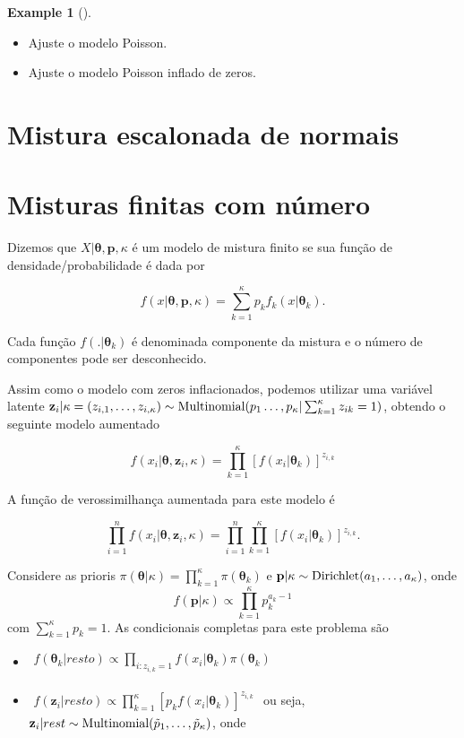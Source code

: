 \documentclass[
  letterpaper,
  DIV=11,
  numbers=noendperiod]{scrreprt}
\theoremstyle{definition}
\theoremstyle{plain}
\theoremstyle{definition}
\newtheorem{example}{Example}[chapter]
\theoremstyle{remark}
\begin{document}
\begin{example}[]
\begin{itemize}
\item
  Ajuste o modelo Poisson.
\item
  Ajuste o modelo Poisson inflado de zeros.
\end{itemize}

\section{Mistura escalonada de
normais}\label{mistura-escalonada-de-normais}

\section{Misturas finitas com
número}\label{misturas-finitas-com-nuxfamero}

Dizemos que \(X|\boldsymbol{\theta},\boldsymbol{p},\kappa\) é um modelo
de mistura finito se sua função de densidade/probabilidade é dada por

\[f(x| \boldsymbol{\theta},\boldsymbol{p} ,\kappa )=\sum_{k=1}^\kappa p_k f_k(x|\boldsymbol{\theta}_k).\]

Cada função \(f(.|\boldsymbol{\theta}_k)\) é denominada componente da
mistura e o número de componentes pode ser desconhecido.

Assim como o modelo com zeros inflacionados, podemos utilizar uma
variável latente
\(\textbf{z}_i|\kappa=(z_{i,1},\ldots,z_{i,\kappa})\sim\hbox{Multinomial}(p_1\ldots,p_\kappa|\sum_{k=1}^\kappa z_{ik}=1)\),
obtendo o seguinte modelo aumentado

\[f(x_i|\boldsymbol{\theta},\textbf{z}_i,\kappa)=\prod_{k=1}^\kappa \left[f\left(x_i|\boldsymbol{\theta}_k\right)\right]^{z_{i,k}}\]

A função de verossimilhança aumentada para este modelo é

\[\prod_{i=1}^n f(x_i|\boldsymbol{\theta},\textbf{z}_i,\kappa)=\prod_{i=1}^n\prod_{k=1}^\kappa \left[f\left(x_i|\boldsymbol{\theta}_k\right)\right]^{z_{i,k}}.\]

Considere as prioris
\(\pi(\boldsymbol{\theta}|\kappa)=\prod_{k=1}^\kappa \pi(\boldsymbol{\theta}_k)\)
e \(\textbf{p}|\kappa\sim\hbox{Dirichlet}(a_1,\ldots,a_\kappa)\), onde
\[f(\textbf{p}|\kappa)\propto \prod_{k=1}^\kappa p_k^{a_k-1}\] com
\(\sum_{k=1}^\kappa p_k=1\). As condicionais completas para este
problema são

\begin{itemize}
\item
  \(\begin{align}f(\boldsymbol{\theta}_k|resto)\propto \prod_{i:z_{i,k}=1}f(x_i|\boldsymbol{\theta}_k)\pi(\boldsymbol{\theta}_k)\end{align}\)
\item
  \(\begin{align}f(\textbf{z}_i|resto)\propto \prod_{k=1}^\kappa \left[p_kf(x_i|\boldsymbol{\theta}_k)\right]^{z_{i,k}}\end{align}\)
  ou seja,
  \(\textbf{z}_i|rest\sim\hbox{Multinomial}(\tilde{p}_1,\ldots,\tilde{p}_\kappa)\),
  onde
\end{itemize}


\end{example}
\end{document}

